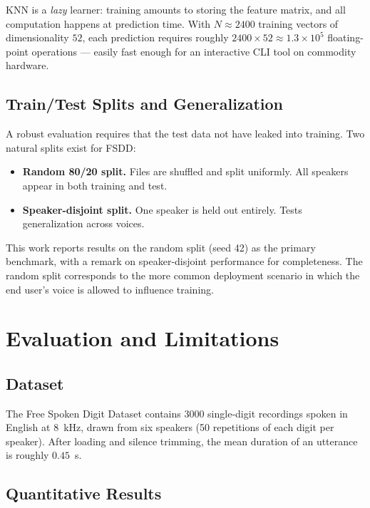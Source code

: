 \documentclass[12pt,a4paper]{article}
\begin{document}
KNN is a \emph{lazy} learner: training amounts to storing the feature matrix,
and all computation happens at prediction time. With $N \approx 2400$
training vectors of dimensionality $52$, each prediction requires roughly
$2400 \times 52 \approx 1.3 \times 10^5$ floating-point operations --- easily
fast enough for an interactive CLI tool on commodity hardware.

\subsection{Train/Test Splits and Generalization}

A robust evaluation requires that the test data not have leaked into
training. Two natural splits exist for FSDD:
\begin{itemize}
    \item \textbf{Random 80/20 split.} Files are shuffled and split
          uniformly. All speakers appear in both training and test.
    \item \textbf{Speaker-disjoint split.} One speaker is held out entirely.
          Tests generalization across voices.
\end{itemize}
This work reports results on the random split (seed 42) as the primary
benchmark, with a remark on speaker-disjoint performance for completeness.
The random split corresponds to the more common deployment scenario in which
the end user's voice is allowed to influence training.

\section{Evaluation and Limitations}

\subsection{Dataset}

The Free Spoken Digit Dataset \cite{fsdd} contains 3000 single-digit
recordings spoken in English at $8$~kHz, drawn from six speakers (50
repetitions of each digit per speaker). After loading and silence trimming,
the mean duration of an utterance is roughly $0.45$~s.

\subsection{Quantitative Results}
\end{document}
